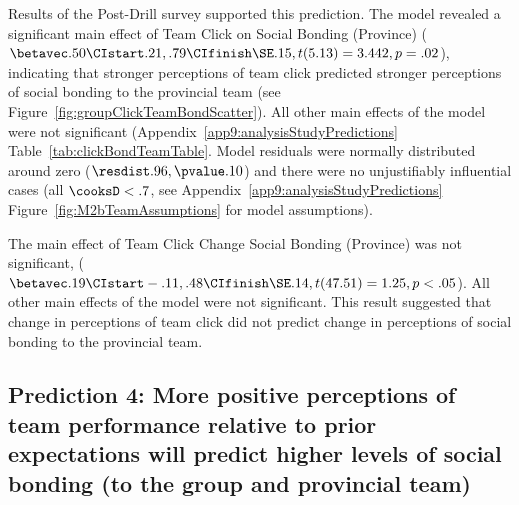\begin{CJK}{UTF8}{gbsn}
Results of the Post-Drill survey supported this prediction. The model revealed a significant main effect of Team Click on Social Bonding (Province) ($\betavec .50 \CIstart .21, .79 \CIfinish \SE .15, t(5.13) = 3.442, p = .02$), indicating that stronger perceptions of team click predicted stronger perceptions of social bonding to the provincial team (see Figure~\ref{fig:groupClickTeamBondScatter}).  All other main effects of the model were not significant (Appendix~\ref{app9:analysisStudyPredictions} Table~\ref{tab:clickBondTeamTable}.  Model residuals were normally distributed around zero ($\resdist .96, \pvalue .10$) and there were no unjustifiably influential cases (all $\cooksD < .7$, see Appendix~\ref{app9:analysisStudyPredictions} Figure~\ref{fig:M2bTeamAssumptions} for model assumptions).







The main effect of Team Click Change Social Bonding (Province) was not significant, ($\betavec .19 \CIstart -.11, .48 \CIfinish \SE .14, t(47.51) = 1.25, p < .05$).  All other main effects of the model were not significant. This result suggested that change in perceptions of team click did not predict change in perceptions of social bonding to the provincial team.







\subsection{Prediction 4: More positive perceptions of team performance relative to prior expectations will predict higher levels of social bonding (to the group and provincial team)}



\end{CJK}
